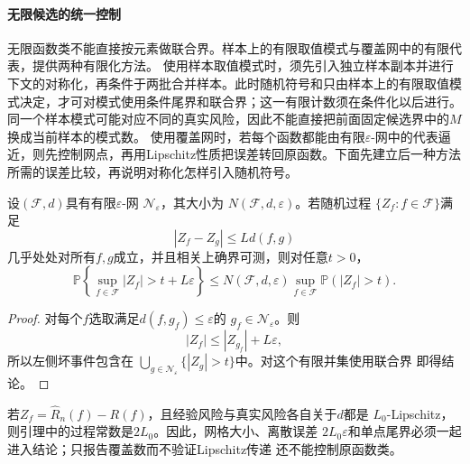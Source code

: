 \paragraph{无限候选的统一控制}
无限函数类不能直接按元素做联合界。样本上的有限取值模式与覆盖网中的有限代表，提供两种有限化方法。
使用样本取值模式时，须先引入独立样本副本并进行下文的对称化，再条件于两批合并样本。此时随机符号和只由样本上的有限取值模式决定，才可对模式使用条件尾界和联合界；这一有限计数须在条件化以后进行。
同一个样本模式可能对应不同的真实风险，因此不能直接把前面固定候选界中的\(M\)换成当前样本的模式数。
使用覆盖网时，若每个函数都能由有限\(\varepsilon\)-网中的代表逼近，则先控制网点，再用Lipschitz性质把误差转回原函数。下面先建立后一种方法所需的误差比较，再说明对称化怎样引入随机符号。

\begin{lemma}[覆盖数的有限网控制]
  \label{lem:probability-covering-finite-net}
  设\((\mathcal{F},d)\)具有有限\(\varepsilon\)-网
  \(\mathcal{N}_\varepsilon\)，其大小为
  \(N(\mathcal{F},d,\varepsilon)\)。若随机过程
  \(\{Z_f:f\in\mathcal{F}\}\)满足
  \[
    |Z_f-Z_g|\leq Ld(f,g)
  \]
  几乎处处对所有\(f,g\)成立，并且相关上确界可测，则对任意\(t>0\)，
  \begin{equation}
    \mathbb{P}\left\{
      \sup_{f\in\mathcal{F}}|Z_f|>t+L\varepsilon
    \right\}
    \leq
    N(\mathcal{F},d,\varepsilon)
    \sup_{f\in\mathcal{F}}\mathbb{P}(|Z_f|>t).
    \label{eq:probability-covering-finite-net}
  \end{equation}
\end{lemma}

\begin{proof}
对每个\(f\)选取满足\(d(f,g_f)\leq\varepsilon\)的
\(g_f\in\mathcal{N}_\varepsilon\)。则
\[
  |Z_f|\leq |Z_{g_f}|+L\varepsilon,
\]
所以左侧坏事件包含在
\(\bigcup_{g\in\mathcal{N}_\varepsilon}\{|Z_g|>t\}\)中。对这个有限并集使用联合界
即得结论。
\end{proof}

若\(Z_f=\widehat R_n(f)-R(f)\)，且经验风险与真实风险各自关于\(d\)都是
\(L_0\)-Lipschitz，则引理中的过程常数是\(2L_0\)。因此，网格大小、离散误差
\(2L_0\varepsilon\)和单点尾界必须一起进入结论；只报告覆盖数而不验证Lipschitz传递
还不能控制原函数类。

